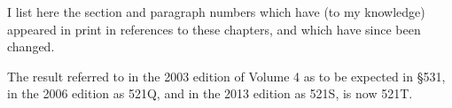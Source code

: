      
\def\chaptername{Concordance}
\def\sectionname{Concordance}
\let\headlinesectionname=\sectionname
     

\medskip
     
I list here the section and paragraph numbers which have 
(to my knowledge) appeared in print in references to these chapters, and 
which have since been changed.

\medskip

 The result 
referred to in the 2003 edition of Volume 4 as to be expected in \S531,
in the 2006 edition as 5{}21Q, and in the 2013
edition as 5{}21S, is now 521T.

\frnewpage


